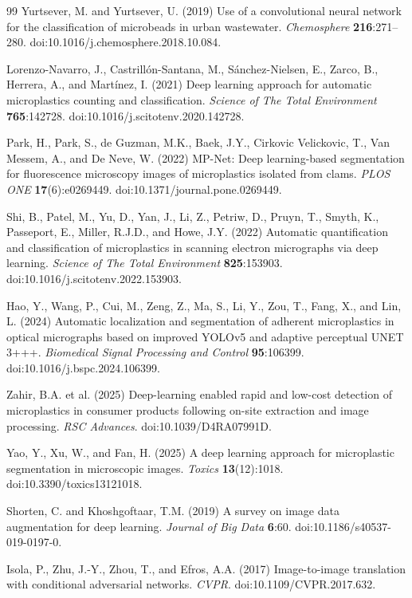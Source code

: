 \documentclass{article}
\begin{document}
{\begin{thebibliography}{99}
Yurtsever, M. and Yurtsever, U. (2019) Use of a convolutional neural network for the classification of microbeads in urban wastewater. \textit{Chemosphere} \textbf{216}:271--280. doi:10.1016/j.chemosphere.2018.10.084.

Lorenzo-Navarro, J., Castrill\'on-Santana, M., S\'anchez-Nielsen, E., Zarco, B., Herrera, A., and Mart\'inez, I. (2021) Deep learning approach for automatic microplastics counting and classification. \textit{Science of The Total Environment} \textbf{765}:142728. doi:10.1016/j.scitotenv.2020.142728.

Park, H., Park, S., de Guzman, M.K., Baek, J.Y., Cirkovic Velickovic, T., Van Messem, A., and De Neve, W. (2022) MP-Net: Deep learning-based segmentation for fluorescence microscopy images of microplastics isolated from clams. \textit{PLOS ONE} \textbf{17}(6):e0269449. doi:10.1371/journal.pone.0269449.

Shi, B., Patel, M., Yu, D., Yan, J., Li, Z., Petriw, D., Pruyn, T., Smyth, K., Passeport, E., Miller, R.J.D., and Howe, J.Y. (2022) Automatic quantification and classification of microplastics in scanning electron micrographs via deep learning. \textit{Science of The Total Environment} \textbf{825}:153903. doi:10.1016/j.scitotenv.2022.153903.

Hao, Y., Wang, P., Cui, M., Zeng, Z., Ma, S., Li, Y., Zou, T., Fang, X., and Lin, L. (2024) Automatic localization and segmentation of adherent microplastics in optical micrographs based on improved YOLOv5 and adaptive perceptual UNET 3+++. \textit{Biomedical Signal Processing and Control} \textbf{95}:106399. doi:10.1016/j.bspc.2024.106399.

Zahir, B.A. et al. (2025) Deep-learning enabled rapid and low-cost detection of microplastics in consumer products following on-site extraction and image processing. \textit{RSC Advances}. doi:10.1039/D4RA07991D.

Yao, Y., Xu, W., and Fan, H. (2025) A deep learning approach for microplastic segmentation in microscopic images. \textit{Toxics} \textbf{13}(12):1018. doi:10.3390/toxics13121018.

Shorten, C. and Khoshgoftaar, T.M. (2019) A survey on image data augmentation for deep learning. \textit{Journal of Big Data} \textbf{6}:60. doi:10.1186/s40537-019-0197-0.

Isola, P., Zhu, J.-Y., Zhou, T., and Efros, A.A. (2017) Image-to-image translation with conditional adversarial networks. \textit{CVPR}. doi:10.1109/CVPR.2017.632.


\end{thebibliography}}
\end{document}
